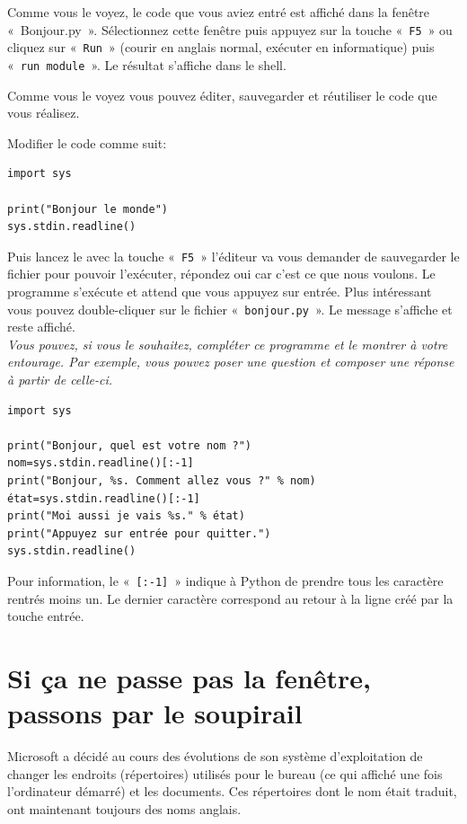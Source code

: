 Comme vous le voyez, le code que vous aviez entré est affiché dans la fenêtre «~Bonjour.py~». Sélectionnez cette fenêtre puis appuyez sur la touche «~\texttt{F5}~» ou cliquez sur «~\texttt{Run}~» (courir en anglais normal, exécuter en informatique) puis «~\texttt{run module}~». Le résultat s'affiche dans le shell.

Comme vous le voyez vous pouvez éditer, sauvegarder et réutiliser le code que vous réalisez.

Modifier le code comme suit: 

\begin{Verbatim}[frame=single,rulecolor=\color{mbleu}, label=à taper]
import sys

print("Bonjour le monde")
sys.stdin.readline()
\end{Verbatim}

Puis lancez le avec la touche «~\texttt{F5}~» l'éditeur va vous demander de sauvegarder le fichier pour pouvoir l'exécuter, répondez oui car c'est ce que nous voulons. Le programme s'exécute et attend que vous appuyez sur entrée. Plus intéressant vous pouvez double-cliquer sur le fichier «~\texttt{bonjour.py}~». Le message s'affiche et reste affiché. \\

\emph{Vous pouvez, si vous le souhaitez, compléter ce programme et le montrer à votre entourage. Par exemple, vous pouvez poser une question et composer une réponse à partir de celle-ci.}\\

\begin{Verbatim}[frame=single,rulecolor=\color{mbleu}, label=à taper]
import sys

print("Bonjour, quel est votre nom ?")
nom=sys.stdin.readline()[:-1]
print("Bonjour, %s. Comment allez vous ?" % nom)
état=sys.stdin.readline()[:-1]
print("Moi aussi je vais %s." % état)
print("Appuyez sur entrée pour quitter.")
sys.stdin.readline()
\end{Verbatim}

Pour information, le «~\texttt{[:-1]}~»  indique à Python de prendre tous les caractère rentrés moins un. Le dernier caractère correspond au retour à la ligne créé par la touche entrée.


\section{Si ça ne passe pas la fenêtre, passons par le soupirail}
Microsoft a décidé au cours des évolutions de son système d'exploitation de changer les endroits (répertoires) utilisés pour le bureau (ce qui affiché une fois l'ordinateur démarré) et les documents. Ces répertoires dont le nom était traduit, ont maintenant toujours des noms anglais.

